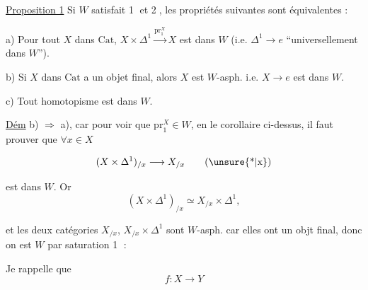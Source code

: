 \uline{Proposition 1} Si $W$ satisfait \textcircled{1} et \textcircled{2},   les propriétés suivantes  sont équivalentes :

a) Pour tout $X$ dans $\mathrm{Cat}$, $X\times\Delta^1\mathrel{\mathop{\longrightarrow}\limits^{\mathrm{pr}_1^X}}X$ est dans $W$ (i.e. $\Delta^1\longrightarrow e$ ``universellement dans $W$'').

b) Si $X$ dans $\mathrm{Cat}$ a un objet final, alors $X$ est $W$-asph. i.e. $X\longrightarrow e$ est dans $W$.

c) Tout homotopisme est dans $W$. 

\uline{Dém} b) $\Rightarrow$ a), car pour voir que $\mathrm{pr}_1^X\in W$, en  le corollaire ci-dessus, il faut prouver que $\forall x\in X$

\[
(X\times\Delta^1)_{/x}\longrightarrow X_{/x}\tag*{(\unsure{*|x})}
\]

est dans $W$. Or
\[
(X\times\Delta^1)_{/x}\simeq X_{/x}\times\Delta^1,
\]


et les deux catégories $X_{/x}$, $X_{/x}\times\Delta^1$ sont $W$-asph. car elles ont un objt final, donc on est  $W$ par saturation \textcircled{1} : 



Je rappelle que
\[
f:X\longrightarrow Y
\]

